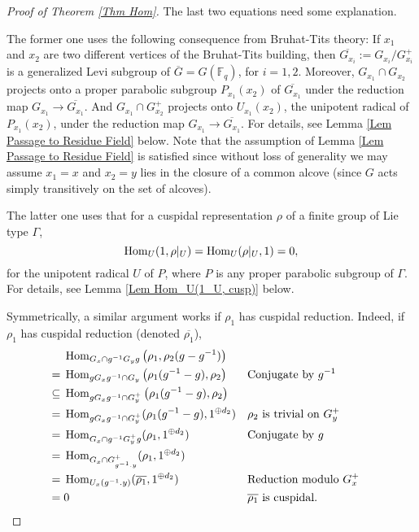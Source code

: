 \begin{proof}[Proof of Theorem \ref{Thm Hom}]
		The last two equations need some explanation. 
		
		The former one uses the following consequence from Bruhat-Tits theory: If $x_1$ and $x_2$ are two different vertices of the Bruhat-Tits building, then $\overline{G_{x_i}}:=G_{x_i}/G_{x_i}^+$ is a generalized Levi subgroup of $\overline{G}=G(\mathbb{F}_q)$, for $i=1, 2$. Moreover, $G_{x_1} \cap G_{x_2}$ projects onto a proper parabolic subgroup $P_{x_1}(x_2)$ of $\overline{G_{x_1}}$ under the reduction map $G_{x_1} \to \overline{G_{x_1}}$. And $G_{x_1} \cap G_{x_2}^+$ projects onto $U_{x_1}(x_2)$, the unipotent radical of $P_{x_1}(x_2)$, under the reduction map $G_{x_1} \to \overline{G_{x_1}}$. For details, see Lemma \ref{Lem Passage to Residue Field} below. Note that the assumption of Lemma \ref{Lem Passage to Residue Field} is satisfied since without loss of generality we may assume $x_1=x$ and $x_2=y$ lies in the closure of a common alcove (since $G$ acts simply transitively on the set of alcoves).
		
		The latter one uses that for a cuspidal representation $\rho$ of a finite group of Lie type $\Gamma$, 
		$$\operatorname{\operatorname{Hom}}_U(1, \rho|_U)=\operatorname{\operatorname{Hom}}_U(\rho|_U, 1)=0,$$
		for the unipotent radical $U$ of $P$, where $P$ is any proper parabolic subgroup of $\Gamma$. For details, see Lemma \ref{Lem Hom_U(1_U, cusp)} below.
		
		Symmetrically, a similar argument works if $\rho_1$ has cuspidal reduction. Indeed, if $\rho_1$ has cuspidal reduction (denoted $\overline{\rho_1}$),
		\begin{align*}    	
			& \Hom_{G_x \cap g^{-1}G_yg}\left(\rho_1, \rho_2(g-g^{-1})\right) \\
			=\;& \Hom_{gG_xg^{-1} \cap G_y}\left(\rho_1(g^{-1}-g), \rho_2\right) && \text{Conjugate by $g^{-1}$}\\ 
			\subseteq\;& \Hom_{gG_xg^{-1} \cap G_y^+}\left(\rho_1(g^{-1}-g), \rho_2\right) && %
			\\
			=\;& \Hom_{gG_xg^{-1} \cap G_y^+}(\rho_1(g^{-1}-g), 1^{\oplus d_2}) && \text{$\rho_2$ is trivial on $G_y^+$ }\\
			=\;& \Hom_{G_x \cap g^{-1}G_y^+g}(\rho_1, 1^{\oplus d_2}) && \text{Conjugate by $g$}\\
			=\;& \Hom_{G_x \cap G_{g^{-1}.y}^+}(\rho_1, 1^{\oplus d_2}) && \\
			=\;& \Hom_{U_x(g^{-1}.y)}(\overline{\rho_1}, 1^{\oplus d_2}) && \text{Reduction modulo $G_x^+$}\\
			=\;& 0 && \text{$\overline{\rho_1}$ is cuspidal. }
		\end{align*}
		
	\end{proof}
	

